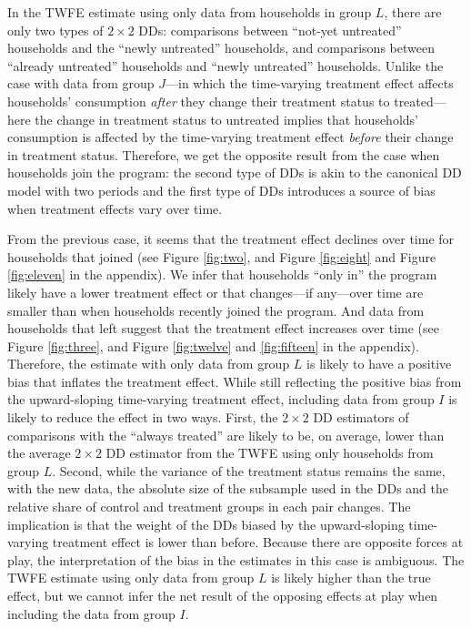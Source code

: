 \documentclass[12pt]{article}
\begin{document}
In the TWFE estimate using only data from households in group $L$, there are only two types of $2 \times 2$  DDs: comparisons between \enquote{not-yet untreated} households and the \enquote{newly untreated} households, and comparisons between \enquote{already untreated} households and \enquote{newly untreated} households. Unlike the case with data from group $J$---in which the time-varying treatment effect affects households’ consumption \emph{after} they change their treatment status to treated---here the change in treatment status to untreated implies that households’ consumption is affected by the time-varying treatment effect \emph{before} their change in treatment status. Therefore, we get the opposite result from the case when households join the program: the second type of DDs is akin to the canonical DD model with two periods and the first type of DDs introduces a source of bias when treatment effects vary over time.

From the previous case, it seems that the treatment effect declines over time for households that joined (see Figure \ref{fig:two}, and Figure \ref{fig:eight} and Figure \ref{fig:eleven} in the appendix). We infer that households \enquote{only in} the program likely have a lower treatment effect or that changes---if any---over time are smaller than when households recently joined the program. And data from households that left suggest that the treatment effect increases over time (see Figure \ref{fig:three}, and Figure \ref{fig:twelve} and \ref{fig:fifteen} in the appendix). Therefore, the estimate with only data from group $L$ is likely to have a positive bias that inflates the treatment effect. While still reflecting the positive bias from the upward-sloping time-varying treatment effect, including data from group $I$ is likely to reduce the effect in two ways. First, the $2 \times 2 $ DD estimators of comparisons with the \enquote{always treated} are likely to be, on average, lower than the average  $2 \times 2$  DD estimator from the TWFE using only households from group $L$. Second, while the variance of the treatment status remains the same, with the new data, the absolute size of the subsample used in the DDs and the relative share of control and treatment groups in each pair changes. The implication is that the weight of the DDs biased by the upward-sloping time-varying treatment effect is lower than before. Because there are opposite forces at play, the interpretation of the bias in the estimates in this case is ambiguous. The TWFE estimate using only data from group $L$ is likely higher than the true effect, but we cannot infer the net result of the opposing effects at play when including the data from group $I$.
\end{document}
